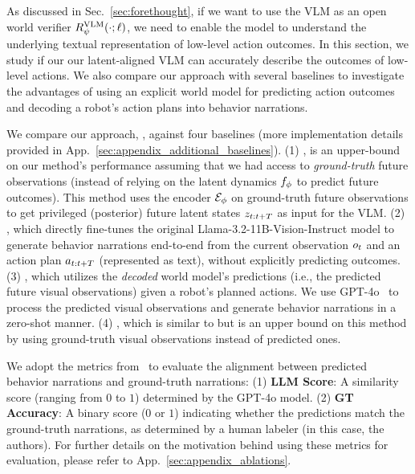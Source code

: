 As discussed in Sec.~\ref{sec:forethought}, if we want to use the VLM as an open world verifier $R^{\text{VLM}}_\psi(\cdot; \ell)$, we need to enable the model to understand the underlying textual representation of low-level action outcomes.
In this section, we study if our our latent-aligned VLM can accurately describe the outcomes of low-level actions. 
We also compare our approach with several baselines to investigate the advantages of using an explicit world model for predicting action outcomes and decoding a robot’s action plans into behavior narrations. 





 We compare our approach, \ours, against four baselines (more implementation details provided in App.~\ref{sec:appendix_additional_baselines}). 
(1) \oursoracle, is an upper-bound on our method's performance assuming that we had access to \textit{ground-truth} future observations (instead of relying on the latent dynamics $f_\phi$ to predict future outcomes). This method uses the encoder $\mathcal{E}_\phi$ on ground-truth future observations to get privileged (posterior) future latent states $z_{t:t+T}$ as input for the VLM. %
(2) \vlmact, which directly fine-tunes the original Llama-3.2-11B-Vision-Instruct model to generate behavior narrations end-to-end from the current observation $o_t$ and an action plan $a_{t:t+T}$ (represented as text), without explicitly predicting outcomes. %
(3) \vlmimg, which utilizes the \textit{decoded} world model's predictions (i.e., the predicted future visual observations) given a robot’s planned actions. We use GPT-4o~\citep{openai2024gpt4technicalreport} to process the predicted visual observations and generate behavior narrations in a zero-shot manner.
(4) \vlmimgoracle, which is similar to \vlmimg but is an upper bound on this method by using ground-truth visual observations instead of predicted ones.

We adopt the metrics from~\citep{duanaha} to evaluate the alignment between predicted behavior narrations and ground-truth narrations:
(1) \textbf{LLM Score}: A similarity score (ranging from $0$ to $1$) determined by the GPT-4o model.
(2) \textbf{GT Accuracy}: A binary score ($0$ or $1$) indicating whether the predictions match the ground-truth narrations, as determined by a human labeler (in this case, the authors). For further details on the motivation behind using these metrics for evaluation, please refer to App.~\ref{sec:appendix_ablations}.




